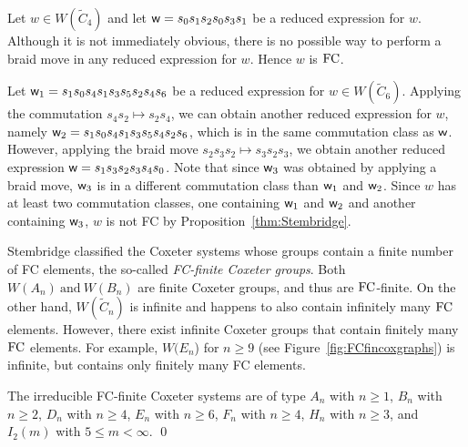 \begin{example}
	Let $w \in W(\widetilde{C}_4)$ and let $\mathsf{w}=s_0s_1s_2s_0s_3s_1$ be a reduced expression for $w$. Although it is not immediately obvious, there is no possible way to perform a braid move in any reduced expression for $w$. Hence $w$ is $\mathrm{FC}$.
\end{example}

\begin{example}
Let $\mathsf{w}_1=s_1s_0s_4s_1s_3s_5s_2s_4s_6$ be a reduced expression for $w \in W(\widetilde{C}_6)$. Applying the commutation $s_4s_2 \mapsto s_2s_4$, we can obtain another reduced expression for $w$, namely $\mathsf{w}_2=s_1s_0s_4s_1s_3s_5s_4s_2s_6$, which is in the same commutation class as $\mathsf{w}$. However, applying the braid move $s_2s_3s_2 \mapsto s_3s_2s_3$, we obtain another reduced expression $\mathsf{w}=s_1s_3s_2s_3s_4s_0$. Note that since $\mathsf{w}_3$ was obtained by applying a braid move, $\mathsf{w}_3$ is in a different commutation class than $\mathsf{w}_1$ and $\mathsf{w}_2$. Since $w$ has at least two commutation classes, one containing $\mathsf{w}_1$ and $\mathsf{w}_2$ and another containing $\mathsf{w}_3$, $w$ is not FC by Proposition~\ref{thm:Stembridge}.
\end{example}


Stembridge classified the Coxeter systems whose groups contain a finite number of FC elements, the so-called \emph{FC-finite Coxeter groups}. Both $W(A_n)~\mathrm{and}~W(B_n)$ are finite Coxeter groups, and thus are $\mathrm{FC}$-finite. On the other hand, $W(\widetilde{C}_n)$ is infinite and happens to also contain infinitely many $\mathrm{FC}$ elements. However, there exist infinite Coxeter groups that contain finitely many $\mathrm{FC}$ elements. For example, $W(E_n$) for $n \geq 9$ (see Figure~\ref{fig:FCfincoxgraphs}) is infinite, but contains only finitely many FC elements.

\begin{proposition}
\label{thm:FCfinite} The irreducible FC-finite Coxeter systems are of type $A_n$ with $n \geq 1$, $B_n$ with $n \geq 2$, $D_n$ with $n \geq 4$, $E_n$ with $n \geq 6$, $F_n$ with $n \geq 4$, $H_n$ with $n \geq 3$, and $I_2(m)$ with $5 \leq m < \infty$. \qed
\end{proposition} 
 

